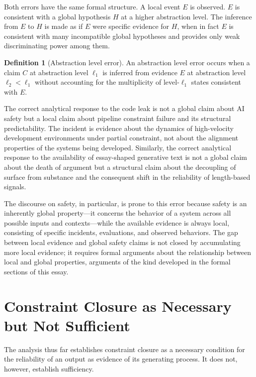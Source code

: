 \documentclass[12pt, oneside]{article}
\theoremstyle{plain}
\theoremstyle{definition}
\newtheorem{definition}[theorem]{Definition}
\theoremstyle{remark}
\begin{document}
Both errors have the same formal structure. A local event $E$ is observed. $E$ is
consistent with a global hypothesis $H$ at a higher abstraction level. The inference from
$E$ to $H$ is made as if $E$ were specific evidence for $H$, when in fact $E$ is consistent
with many incompatible global hypotheses and provides only weak discriminating power among
them.

\begin{definition}[Abstraction level error]
An abstraction level error occurs when a claim $C$ at abstraction level $\ell_1$ is
inferred from evidence $E$ at abstraction level $\ell_2 < \ell_1$ without accounting for
the multiplicity of level-$\ell_1$ states consistent with $E$.
\end{definition}

The correct analytical response to the code leak is not a global claim about AI safety but
a local claim about pipeline constraint failure and its structural predictability. The
incident is evidence about the dynamics of high-velocity development environments under
partial constraint, not about the alignment properties of the systems being developed.
Similarly, the correct analytical response to the availability of essay-shaped generative
text is not a global claim about the death of argument but a structural claim about the
decoupling of surface from substance and the consequent shift in the reliability of
length-based signals.

The discourse on safety, in particular, is prone to this error because safety is an
inherently global property---it concerns the behavior of a system across all possible
inputs and contexts---while the available evidence is always local, consisting of specific
incidents, evaluations, and observed behaviors. The gap between local evidence and global
safety claims is not closed by accumulating more local evidence; it requires formal arguments
about the relationship between local and global properties, arguments of the kind developed
in the formal sections of this essay.

\section{Constraint Closure as Necessary but Not Sufficient}

The analysis thus far establishes constraint closure as a necessary condition for
the reliability of an output as evidence of its generating process. It does not,
however, establish sufficiency.
\end{document}
